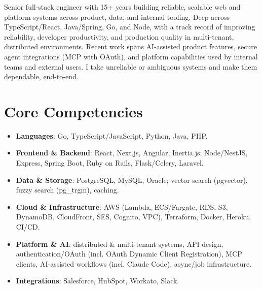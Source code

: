 \documentclass[11pt,a4paper,sans]{moderncv}
\begin{document}
\makecvtitle


\vspace{6pt}
\small{Senior full-stack engineer with 15+ years building reliable, scalable web and platform systems across product, data, and internal tooling. Deep across TypeScript/React, Java/Spring, Go, and Node, with a track record of improving reliability, developer productivity, and production quality in multi-tenant, distributed environments. Recent work spans AI-assisted product features, secure agent integrations (MCP with OAuth), and platform capabilities used by internal teams and external users. I take unreliable or ambiguous systems and make them dependable, end-to-end.}


\section{Core Competencies}
\vspace{1pt}
\begin{itemize}

\item \textbf{Languages}: Go, TypeScript/JavaScript, Python, Java, PHP.

\item \textbf{Frontend \& Backend}: React, Next.js, Angular, Inertia.js; Node/NestJS, Express, Spring Boot, Ruby on Rails, Flask/Celery, Laravel.

\item \textbf{Data \& Storage}: PostgreSQL, MySQL, Oracle; vector search (pgvector), fuzzy search (pg\_trgm), caching.

\item \textbf{Cloud \& Infrastructure}: AWS (Lambda, ECS/Fargate, RDS, S3, DynamoDB, CloudFront, SES, Cognito, VPC), Terraform, Docker, Heroku, CI/CD.

\item \textbf{Platform \& AI}: distributed \& multi-tenant systems, API design, authentication/OAuth (incl. OAuth Dynamic Client Registration), MCP clients, AI-assisted workflows (incl. Claude Code), async/job infrastructure.

\item \textbf{Integrations}: Salesforce, HubSpot, Workato, Slack.

\end{itemize}
\end{document}
